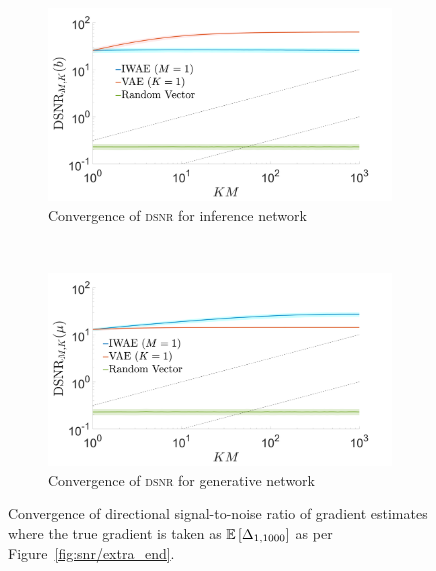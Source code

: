 \begin{figure}[h]
	\centering
	\begin{subfigure}[b]{0.45\textwidth}
		\centering
		\includegraphics[width=\textwidth]{figures/tighter_bounds/hv_dir_snr_end}
		\caption{Convergence of \textsc{dsnr} for inference network\label{fig:snr/hv_snr_dir_end}}
	\end{subfigure} ~~~~~~~~~~
	\begin{subfigure}[b]{0.45\textwidth}
		\centering
		\includegraphics[width=\textwidth]{figures/tighter_bounds/hv_dir_snr_mu_end}
		\caption{Convergence of \textsc{dsnr} for generative network\label{fig:snr/hv_snr_dir_mu_end}}
	\end{subfigure}
	\caption{Convergence of directional signal-to-noise ratio of gradient estimates where the
		true gradient is taken as $\mathbb{E} \left[\Delta_{1,1000}\right]$ as per
		Figure~\ref{fig:snr/extra_end}.
		\label{fig:snr/hv_extra_end}}
\end{figure}